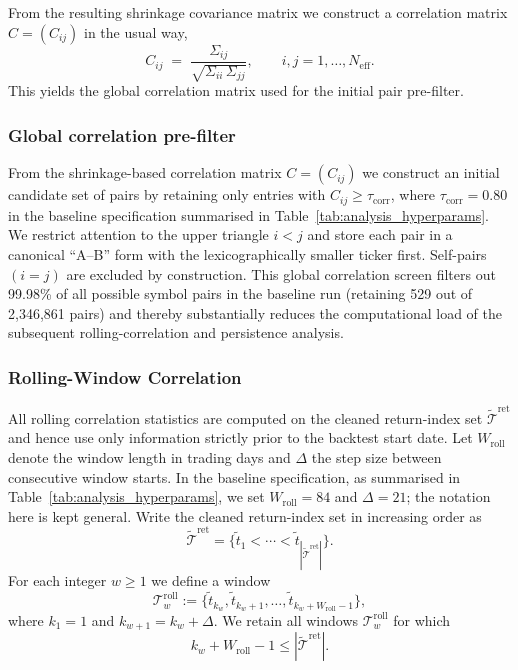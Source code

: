 \documentclass[11pt,a4paper]{article}
\begin{document}
From the resulting shrinkage covariance matrix we construct a correlation matrix
\(C=(C_{ij})\) in the usual way,
\[
  C_{ij}
  \;=\;
  \frac{\Sigma_{ij}}{\sqrt{\Sigma_{ii}\,\Sigma_{jj}}},
  \qquad i,j=1,\dots,N_{\text{eff}}.
\]
This yields the global correlation matrix used for the initial pair pre-filter.

\subsubsection{Global correlation pre-filter}

From the shrinkage-based correlation matrix \(C = (C_{ij})\) we construct an
initial candidate set of pairs by retaining only entries with
\(C_{ij} \ge \tau_{\text{corr}}\), where \(\tau_{\text{corr}} = 0.80\) in the
baseline specification summarised in Table~\ref{tab:analysis_hyperparams}. We
restrict attention to the upper triangle \(i<j\) and store each pair in a
canonical ``A--B'' form with the lexicographically smaller ticker first.
Self-pairs \((i=j)\) are excluded by construction. This global correlation
screen filters out 99.98\% of all possible symbol pairs in the baseline run
(retaining 529 out of 2{,}346{,}861 pairs) and thereby substantially reduces
the computational load of the subsequent rolling-correlation and persistence
analysis.

\subsubsection{Rolling-Window Correlation}\label{sec:rolling-corr}

All rolling correlation statistics are computed on the cleaned return-index set
\(\widetilde{\mathcal{T}}^{\mathrm{ret}}\) and hence use only information
strictly prior to the backtest start date. Let \(W_{\text{roll}}\) denote the
window length in trading days and \(\Delta\) the step size between consecutive
window starts. In the baseline specification, as summarised in
Table~\ref{tab:analysis_hyperparams}, we set \(W_{\text{roll}} = 84\) and
\(\Delta = 21\); the notation here is kept general. Write the cleaned
return-index set in increasing order as
\[
  \widetilde{\mathcal{T}}^{\mathrm{ret}}
  =
  \{\tilde t_1 < \cdots < \tilde t_{|\widetilde{\mathcal{T}}^{\mathrm{ret}}|}\}.
\]
For each integer \(w \ge 1\) we define a window
\[
  \mathcal{T}^{\mathrm{roll}}_w
  :=
  \{\tilde t_{k_w}, \tilde t_{k_w+1}, \dots, \tilde t_{k_w+W_{\text{roll}}-1}\},
\]
where \(k_1 = 1\) and \(k_{w+1} = k_w + \Delta\). We retain all windows
\(\mathcal{T}^{\mathrm{roll}}_w\) for which
\[
  k_w + W_{\text{roll}} - 1 \le |\widetilde{\mathcal{T}}^{\mathrm{ret}}|.
\]
\end{document}
